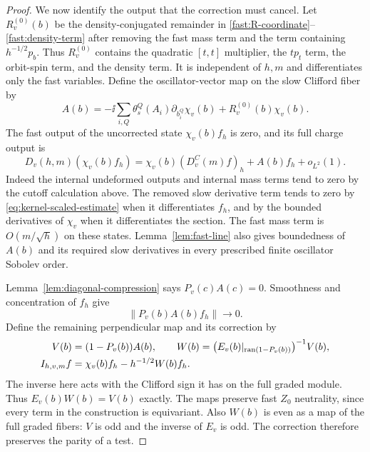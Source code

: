 \begin{proof}
We now identify the output that the correction must cancel. Let
$R_v^{(0)}(b)$ be the density-conjugated remainder in
\eqref{fast:R-coordinate}--\eqref{fast:density-term} after removing
the fast mass term and the term containing $h^{-1/2}p_b$.
Thus $R_v^{(0)}$ contains the quadratic $[t,t]$ multiplier, the
$tp_t$ term, the orbit-spin term, and the density term. It is
independent of $h,m$ and differentiates only the fast variables.
Define the oscillator-vector map on the slow Clifford fiber by
\begin{equation}
 A(b)=-\ii\sum_{i,Q}\theta_s^Q(A_i)
                         \partial_{b_i^Q}\chi_v(b)
                       +R_v^{(0)}(b)\chi_v(b).
 \label{lift:residual-map}
\end{equation}
The fast output of the uncorrected state $\chi_v(b)f_h$ is zero,
and its full charge output is
\begin{equation}
 D_v(h,m)(\chi_v(b)f_h)
 =\chi_v(b)(D_v^C(m)f)_h+A(b)f_h+o_{L^2}(1).
 \label{lift:uncorrected-output}
\end{equation}
Indeed the internal undeformed outputs and internal mass terms
tend to zero by the cutoff calculation above. The removed slow
derivative term tends to zero by
\eqref{eq:kernel-scaled-estimate} when it differentiates $f_h$,
and by the bounded derivatives of $\chi_v$ when it differentiates
the section. The fast mass term is $O(m/\sqrt h)$ on these states.
Lemma~\ref{lem:fast-line} also gives boundedness of $A(b)$ and its
required slow derivatives in every prescribed finite oscillator
Sobolev order.

Lemma~\ref{lem:diagonal-compression} says $P_v(c)A(c)=0$. Smoothness
and concentration of $f_h$ give
\[
 \|P_v(b)A(b)f_h\|\longrightarrow0.
\]
Define the remaining perpendicular map and its correction by
\begin{equation}
 \begin{split}
 V(b)&=(1-P_v(b))A(b),\qquad
 W(b)=\bigl(E_v(b)|_{\operatorname{ran}(1-P_v(b))}\bigr)^{-1}V(b),\\
 I_{h,v,m}f&=\chi_v(b)f_h-h^{-1/2}W(b)f_h.
 \end{split}
 \label{lift:correction}
\end{equation}
The inverse here acts with the Clifford sign it has on the full
graded module. Thus $E_v(b)W(b)=V(b)$ exactly. The maps preserve
fast $Z_0$ neutrality, since every term in the construction is
equivariant. Also $W(b)$ is even as a map of the full graded
fibers: $V$ is odd and the inverse of $E_v$ is odd. The correction
therefore preserves the parity of a test.


\end{proof}
